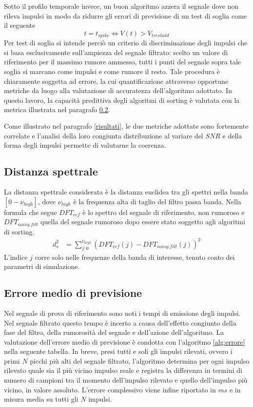 Sotto il profilo temporale invece, un buon algoritmo azzera il segnale dove non rileva impulsi in modo da ridurre gli errori di previsione di un test di soglia come il seguente
\begin{equation*}
t = t_{spike} \Leftrightarrow V(t) > V_{treshold}
\end{equation*}
Per test di soglia si intende perciò un criterio di discriminazione degli impulsi che si basa esclusivamente sull'ampiezza del segnale filtrato: scelto un valore di riferimento per il massimo rumore ammesso, tutti i punti del segnale sopra tale soglia si marcano come impulsi e come rumore il resto.
Tale procedura è chiaramente soggetta ad errore, la cui quantificazione 
attraverso opportune metriche da luogo alla valutazione di accuratezza dell'algoritmo adottato. In questo lavoro, la capacità predittiva degli algoritmi di sorting è valutata con la metrica illustrata nel paragrafo \ref{metricaT}.

Come illustrato nel paragrafo \ref{risultati}, le due metriche adottate sono fortemente correlate e l'analisi della loro congiunta distribuzione al variare del $SNR$ e della forma degli impulsi permette di valutarne la coerenza.



\subsection{Distanza spettrale}
\label{metricaS}

La distanza spettrale considerata è la distanza euclidea tra gli spettri nella banda $[0-\nu_{high}]$, dove $\nu_{high}$ è la frequenza alta di taglio del filtro passa banda.
% 
Nella formula che segue $DFT_{ref}$ è lo spettro del segnale di riferimento, non rumoroso e $DFT_{noisy.filt}$ quella del segnale rumoroso dopo essere stato soggetto agli algoritmi di sorting.
%
\begin{align*}
 d_{s}^2 & = \sum_{j:0}^{\nu_{high}}(DFT_{ref}(j) - DFT_{noisy.filt}(j) )^2
\end{align*}
%
L'indice $j$ corre solo nelle frequenze della banda di interesse, tenuto conto dei parametri di simulazione.




\subsection{Errore medio di previsione}
\label{metricaT}

Nel segnale di prova di riferimento sono noti i tempi di emissione degli impulsi.
%
Nel segnale filtrato questo tempo è incerto a causa dell'effetto congiunto della fase del filtro, della rumorosità del segnale e dell'azione dell'algoritmo.
%
La valutazione dell'errore medio di previsione è condotta con l'algoritmo \ref{alg:errore} nella seguente tabella. In breve, presi tutti e soli gli impulsi rilevati, ovvero i primi $N$ picchi più alti del segnale filtrato, l'algoritmo determina per ogni impulso rilevato quale sia il più vicino impulso reale e registra la differenza in termini di numero di campioni tra il momento dell'impulso rilevato e quello dell'impulso più vicino, in valore assoluto. L'errore complessivo viene infine riportato in $ms$ e in misura media su tutti gli $N$ impulsi.


